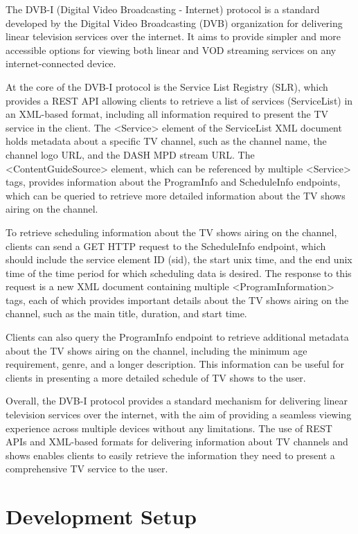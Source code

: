 \documentclass[conference]{IEEEtran}
\begin{document}
The DVB-I (Digital Video Broadcasting - Internet) protocol is a standard developed by the Digital Video Broadcasting (DVB) organization for delivering linear television services over the internet. It aims to provide simpler and more accessible options for viewing both linear and VOD streaming services on any internet-connected device.

At the core of the DVB-I protocol is the Service List Registry (SLR), which provides a REST API allowing clients to retrieve a list of services (ServiceList) in an XML-based format, including all information required to present the TV service in the client. The <Service> element of the ServiceList XML document holds metadata about a specific TV channel, such as the channel name, the channel logo URL, and the DASH MPD stream URL. The <ContentGuideSource> element, which can be referenced by multiple <Service> tags, provides information about the ProgramInfo and ScheduleInfo endpoints, which can be queried to retrieve more detailed information about the TV shows airing on the channel.

To retrieve scheduling information about the TV shows airing on the channel, clients can send a GET HTTP request to the ScheduleInfo endpoint, which should include the service element ID (sid), the start unix time, and the end unix time of the time period for which scheduling data is desired. The response to this request is a new XML document containing multiple <ProgramInformation> tags, each of which provides important details about the TV shows airing on the channel, such as the main title, duration, and start time.

Clients can also query the ProgramInfo endpoint to retrieve additional metadata about the TV shows airing on the channel, including the minimum age requirement, genre, and a longer description. This information can be useful for clients in presenting a more detailed schedule of TV shows to the user.

Overall, the DVB-I protocol provides a standard mechanism for delivering linear television services over the internet, with the aim of providing a seamless viewing experience across multiple devices without any limitations. The use of REST APIs and XML-based formats for delivering information about TV channels and shows enables clients to easily retrieve the information they need to present a comprehensive TV service to the user.


\section{Development Setup}
\end{document}
